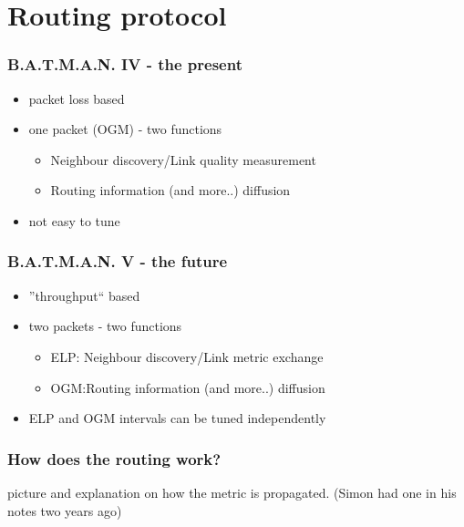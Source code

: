 \documentclass[slidestop]{beamer}
\begin{document}
\section{Routing protocol}
\begin{frame}[c]
	\frametitle{B.A.T.M.A.N. IV - the present}
	\begin{itemize}
		\item packet loss based
		\item one packet (OGM) - two functions
			\begin{itemize}
				\item Neighbour discovery/Link quality
					measurement
				\item Routing information (and more..) diffusion
			\end{itemize}
		\item not easy to tune
	\end{itemize}
\end{frame}

\begin{frame}[c]
	\frametitle{B.A.T.M.A.N. V - the future}
	\begin{itemize}
		\item ''throughput`` based
		\item two packets - two functions
			\begin{itemize}
				\item ELP: Neighbour discovery/Link metric
					exchange
				\item OGM:Routing information (and more..) diffusion
			\end{itemize}
		\item ELP and OGM intervals can be tuned independently
	\end{itemize}
	\begin{figure}
		\centering
	\end{figure}
\end{frame}

\begin{frame}[c]
	\frametitle{How does the routing work?}
	picture and explanation on how the metric is propagated. (Simon had one
	in his notes two years ago)
\end{frame}
\end{document}
